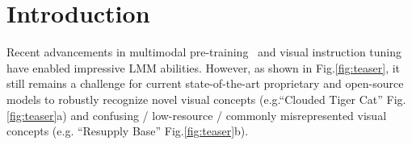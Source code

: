 \section{Introduction}
\label{sec:intro}




















Recent advancements in multimodal pre-training~\cite{2023GPT4VisionSC, team2023gemini, hurst2024gpt4o} and visual instruction tuning~\cite{liu2023llava, liu2023improvedllava, liu2024llavanext} have enabled impressive LMM abilities. However, as shown in Fig.\ref{fig:teaser}, it still remains a challenge for current state-of-the-art proprietary and open-source models to robustly recognize novel visual concepts (e.g.``Clouded Tiger Cat'' Fig.\ref{fig:teaser}a) and confusing / low-resource / commonly misrepresented visual concepts (e.g. ``Resupply Base'' Fig.\ref{fig:teaser}b).


